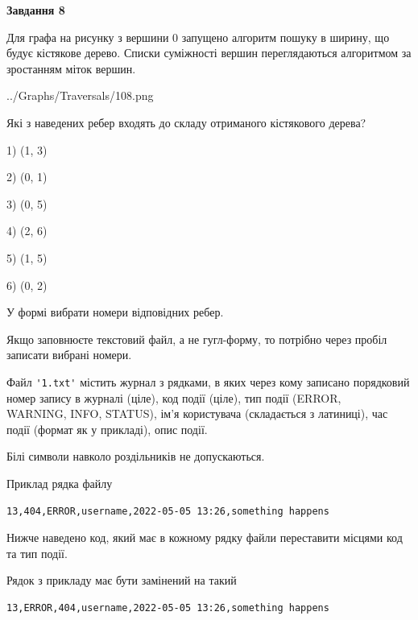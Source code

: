 \documentclass[12pt, ukrainian]{article}
\def\code#1{\Verb!#1!}
\begin{document}
{\begin {large}
{\begin {center}\textbf{Завдання 8}\end {center}}\par
Для графа на рисунку з вершини 0 запущено алгоритм пошуку в ширину, що будує кістякове дерево. Списки суміжності вершин переглядаються алгоритмом за зростанням міток вершин.\par
\begin{center}
	{../Graphs/Traversals/108.png}
\end{center}
\par Які з наведених ребер входять до складу отриманого кістякового дерева?\par
1) (1, 3)\par
2) (0, 1)\par
3) (0, 5)\par
4) (2, 6)\par
5) (1, 5)\par
6) (0, 2)\par
{\vskip 15pt} У формі вибрати номери відповідних ребер.


Якщо заповнюєте текстовий файл, а не гугл-форму, то потрібно через пробіл записа\-ти вибрані номери.\par
\newpage


Файл \code{'1.txt'} містить журнал з рядками, в яких через кому записано поряд\-ко\-вий номер запису в журналі (ціле), код події (ціле), тип події (ERROR,\\ WARNING, INFO, STATUS), ім'я користувача (складається з латиниці), час події (фор\-мат як у прикладі), опис події.

Білі символи навколо роздільників не допускаються.

Приклад рядка файлу



\begin{verbatim}
13,404,ERROR,username,2022-05-05 13:26,something happens
\end{verbatim}


Нижче наведено код, який має в кожному рядку файли переставити місцями код та тип події.

Рядок з прикладу має бути замінений на такий



\begin{verbatim}
13,ERROR,404,username,2022-05-05 13:26,something happens
\end{verbatim}





\end{large}}
\end{document}
